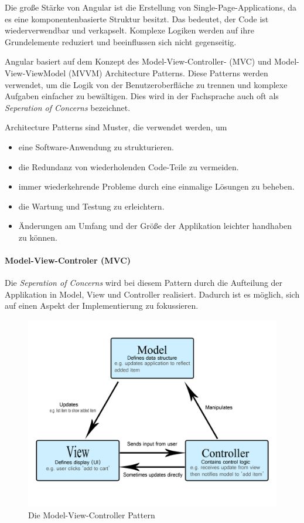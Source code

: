 Die große Stärke von Angular ist die Erstellung von Single-Page-Applications, da es eine komponentenbasierte Struktur besitzt. Das bedeutet, der Code ist wiederverwendbar und verkapselt. Komplexe Logiken werden auf ihre Grundelemente reduziert und beeinflussen sich nicht gegenseitig. \cite{AngularGeneral}

Angular basiert auf dem Konzept des Model-View-Controller- (MVC) und Model-View-ViewModel (MVVM) Architecture Patterns. Diese Patterns werden verwendet, um die Logik von der Benutzeroberfläche zu trennen und komplexe Aufgaben einfacher zu bewältigen. Dies wird in der Fachsprache auch oft als \emph{Seperation of Concerns} bezeichnet.
\cite{AngularArchitecturePattern} 

Architecture Patterns sind Muster, die verwendet werden, um
\begin{itemize}
  \item eine Software-Anwendung zu strukturieren.
  \item die Redundanz von wiederholenden Code-Teile zu vermeiden.
  \item immer wiederkehrende Probleme durch eine einmalige Lösungen zu beheben.
  \item die Wartung und Testung zu erleichtern.
  \item Änderungen am Umfang und der Größe der Applikation leichter handhaben zu können.
\end{itemize} \cite{MVCmdn, MVVM, MVC}

\paragraph{Model-View-Controler (MVC)}
Die \emph{Seperation of Concerns} wird bei diesem Pattern durch die Aufteilung der Applikation in Model, View und Controller realisiert. Dadurch ist es möglich, sich auf einen Aspekt der Implementierung zu fokussieren. 

\begin{figure} [h t]
  \centering
  \includegraphics[scale=0.5]{pics/mvc.png}
  \caption{Die Model-View-Controller Pattern \cite{MVCmdn}}
  \label{fig:tech:front:mvc-architecture}
\end{figure}

